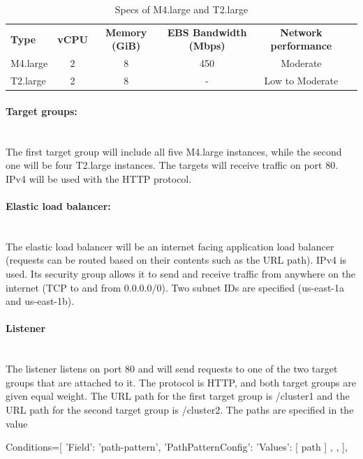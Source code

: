 \documentclass[11pt]{article}
\begin{document}
\begin{table}[h!]
    \caption{Specs of M4.large and T2.large}
    \label{tab:table1}
    \begin{tabular}{|l|c|c|c|c|r|}
        \hline
        \textbf{Type} & \textbf{vCPU} & \textbf{Memory (GiB)} & \textbf{EBS Bandwidth (Mbps)} & \textbf{Network performance}\\
        M4.large & 2 & 8 &450 &Moderate\\
        T2.large & 2 & 8 &- &Low to Moderate\\
        \hline
    \end{tabular}
\end{table}

\paragraph{Target groups:}\mbox{}\\
The first target group will include all five M4.large instances, while the second one will be four T2.large instances. The targets will receive traffic on port 80. IPv4 will be used with the HTTP protocol.

\paragraph{Elastic load balancer:}\mbox{}\\
The elastic load balancer will be an internet facing application load balancer (requests can be routed based on their contents such as the URL path). IPv4 is used. Its security group allows it to send and receive traffic from anywhere on the internet (TCP to and from 0.0.0.0/0). Two subnet IDs are specified (us-east-1a and us-east-1b).

\paragraph{Listener}\mbox{}\\
The listener listens on port 80 and will send requests to one of the two target groups that are attached to it. The protocol is HTTP, and both target groups are given equal weight. The URL path for the first target group is /cluster1 and the URL path for the second target group is /cluster2. The paths are specified in the value

\begin{python}[h!]
    Conditions=[
        {
            'Field': 'path-pattern',
            'PathPatternConfig': {
                'Values': [
                    path
                ]
            },
        },
    ],
\end{python}
\end{document}
